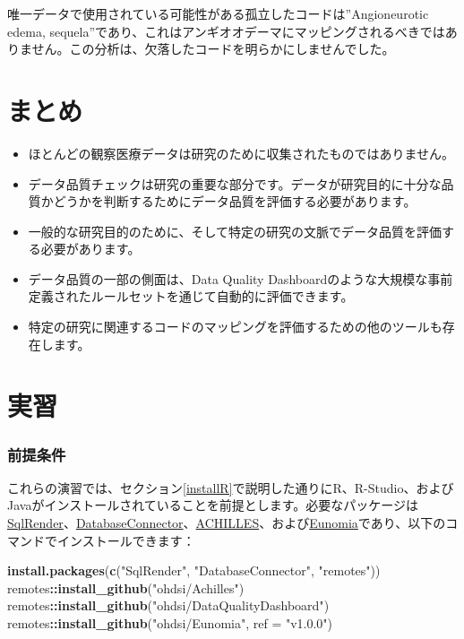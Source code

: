 \documentclass[
  11pt]{book}
\makeatletter
\newenvironment{Shaded}{\begin{snugshade}}{\end{snugshade}}
\newcommand{\AttributeTok}[1]{\textcolor[rgb]{0.13,0.29,0.53}{#1}}
\newcommand{\FunctionTok}[1]{\textcolor[rgb]{0.13,0.29,0.53}{\textbf{#1}}}
\newcommand{\NormalTok}[1]{#1}
\newcommand{\SpecialCharTok}[1]{\textcolor[rgb]{0.81,0.36,0.00}{\textbf{#1}}}
\newcommand{\StringTok}[1]{\textcolor[rgb]{0.31,0.60,0.02}{#1}}
\newenvironment{kframe}{%
\medskip{}
\setlength{\fboxsep}{.8em}
 \def\at@end@of@kframe{}%
 \ifinner\ifhmode%
  \def\at@end@of@kframe{\end{minipage}}%
  \begin{minipage}{\columnwidth}%
 \fi\fi%
 \def\FrameCommand##1{\hskip\@totalleftmargin \hskip-\fboxsep
 \colorbox{myShadeColor}{##1}\hskip-\fboxsep
     \hskip-\linewidth \hskip-\@totalleftmargin \hskip\columnwidth}%
 \MakeFramed {\advance\hsize-\width
   \@totalleftmargin\z@ \linewidth\hsize
   \@setminipage}}%
 {\par\unskip\endMakeFramed%
 \at@end@of@kframe}
\newenvironment{rmdblock}[1]
  {
  \begin{itemize}
  \renewcommand{\labelitemi}{
    \raisebox{-.7\height}[0pt][0pt]{
      {\setkeys{Gin}{width=3em,keepaspectratio}\texttt{[image: images/\#1]}}
    }
  }
  \setlength{\fboxsep}{1em}
  \begin{kframe}
  \item
  }
  {
  \end{kframe}
  \end{itemize}
  }
\newenvironment{rmdsummary}
  {\begin{rmdblock}{summary}}
  {\end{rmdblock}}
\theoremstyle{definition}
\theoremstyle{definition}
\theoremstyle{definition}
\theoremstyle{definition}
\theoremstyle{remark}
\makeatother
\begin{document}
唯一データで使用されている可能性がある孤立したコードは''Angioneurotic edema, sequela''であり、これはアンギオオデーマにマッピングされるべきではありません。この分析は、欠落したコードを明らかにしませんでした。

\section{まとめ}\label{ux307eux3068ux3081-11}

\begin{rmdsummary}
\begin{itemize}
\item
  ほとんどの観察医療データは研究のために収集されたものではありません。
\item
  データ品質チェックは研究の重要な部分です。データが研究目的に十分な品質かどうかを判断するためにデータ品質を評価する必要があります。
\item
  一般的な研究目的のために、そして特定の研究の文脈でデータ品質を評価する必要があります。
\item
  データ品質の一部の側面は、Data Quality Dashboardのような大規模な事前定義されたルールセットを通じて自動的に評価できます。
\item
  特定の研究に関連するコードのマッピングを評価するための他のツールも存在します。
\end{itemize}
\end{rmdsummary}

\section{実習}\label{ux5b9fux7fd2}

\subsubsection*{前提条件}\label{ux524dux63d0ux6761ux4ef6-9}

これらの演習では、セクション\ref{installR}で説明した通りにR、R-Studio、およびJavaがインストールされていることを前提とします。必要なパッケージは\href{https://ohdsi.github.io/SqlRender/}{SqlRender}、\href{https://ohdsi.github.io/DatabaseConnector/}{DatabaseConnector}、\href{https://github.com/OHDSI/Achilles}{ACHILLES}、および\href{https://ohdsi.github.io/Eunomia/}{Eunomia}であり、以下のコマンドでインストールできます：

\begin{Shaded}
\begin{Highlighting}[]
\FunctionTok{install.packages}\NormalTok{(}\FunctionTok{c}\NormalTok{(}\StringTok{"SqlRender"}\NormalTok{, }\StringTok{"DatabaseConnector"}\NormalTok{, }\StringTok{"remotes"}\NormalTok{))}
\NormalTok{remotes}\SpecialCharTok{::}\FunctionTok{install\_github}\NormalTok{(}\StringTok{"ohdsi/Achilles"}\NormalTok{)}
\NormalTok{remotes}\SpecialCharTok{::}\FunctionTok{install\_github}\NormalTok{(}\StringTok{"ohdsi/DataQualityDashboard"}\NormalTok{)}
\NormalTok{remotes}\SpecialCharTok{::}\FunctionTok{install\_github}\NormalTok{(}\StringTok{"ohdsi/Eunomia"}\NormalTok{, }\AttributeTok{ref =} \StringTok{"v1.0.0"}\NormalTok{)}
\end{Highlighting}
\end{Shaded}
\end{document}
